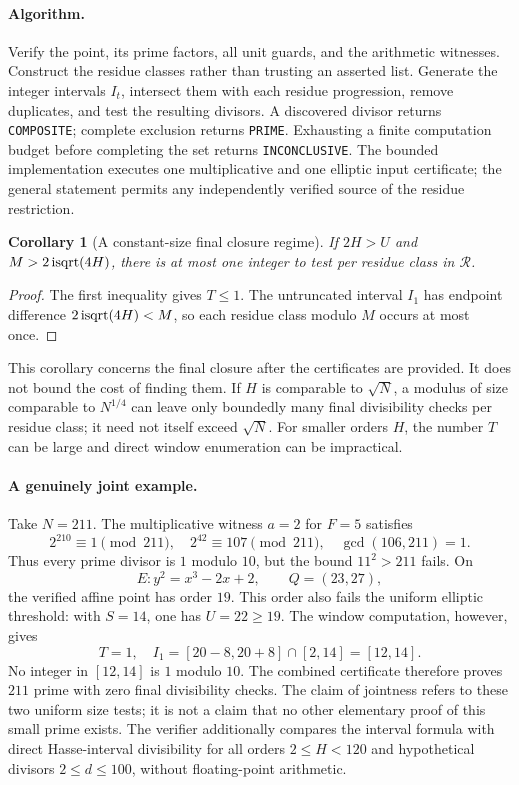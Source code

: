 \documentclass[11pt,a4paper]{article}
\newtheorem{corollary}[theorem]{Corollary}
\theoremstyle{definition}\newtheorem{definition}[theorem]{Definition}
\theoremstyle{remark}\newtheorem{remark}[theorem]{Remark}
\begin{document}
\paragraph{Algorithm.}
Verify the point, its prime factors, all unit guards, and the arithmetic
witnesses.  Construct the residue classes rather than trusting an asserted
list.  Generate the integer intervals $I_t$, intersect them with each
residue progression, remove duplicates, and test the resulting divisors.
A discovered divisor returns \texttt{COMPOSITE}; complete exclusion returns
\texttt{PRIME}.  Exhausting a finite computation budget before completing
the set returns \texttt{INCONCLUSIVE}.  The bounded implementation executes
one multiplicative and one elliptic input certificate; the general
statement permits any independently verified source of the residue
restriction.

\begin{corollary}[A constant-size final closure regime]\label{cor:cert-one-window}
If $2H>U$ and $M>2\operatorname{isqrt}(4H)$, there is at most one integer to test per
residue class in $\mathcal R$.
\end{corollary}
\begin{proof}
The first inequality gives $T\le1$.  The untruncated interval $I_1$ has
endpoint difference $2\operatorname{isqrt}(4H)<M$, so each residue class modulo $M$
occurs at most once.
\end{proof}

This corollary concerns the final closure after the certificates are
provided.  It does not bound the cost of finding them.  If $H$ is comparable
to $\sqrt N$, a modulus of size comparable to $N^{1/4}$ can leave only
boundedly many final divisibility checks per residue class; it need not itself exceed
$\sqrt N$.  For smaller orders $H$, the number $T$ can be large and direct
window enumeration can be impractical.

\paragraph{A genuinely joint example.}
Take $N=211$.  The multiplicative witness $a=2$ for $F=5$ satisfies
\[
 2^{210}\equiv1\pmod{211},\quad 2^{42}\equiv107\pmod{211},
 \quad\gcd(106,211)=1.
\]
Thus every prime divisor is $1$ modulo $10$, but the bound $11^2>211$
fails.  On
\[
 E:y^2=x^3-2x+2,\qquad Q=(23,27),
\]
the verified affine point has order $19$.  This order also fails the
uniform elliptic threshold: with $S=14$, one has $U=22\ge19$.
The window computation, however, gives
\[
 T=1,\quad I_1=[20-8,20+8]\cap[2,14]=[12,14].
\]
No integer in $[12,14]$ is $1$ modulo $10$.  The combined certificate
therefore proves $211$ prime with zero final divisibility checks.  The
claim of jointness refers to these two uniform size tests; it is not a
claim that no other elementary proof of this small prime exists.
The verifier additionally compares the interval formula with direct
Hasse-interval divisibility for all orders $2\le H<120$ and hypothetical
divisors $2\le d\le100$, without floating-point arithmetic.
\end{document}
